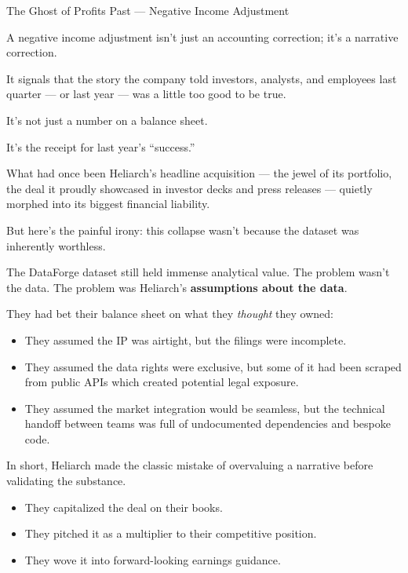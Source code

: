 \begin{HistoricalSidebar}{The Ghost of Profits Past --- Negative Income Adjustment}
  \medskip
  
  A negative income adjustment isn’t just an accounting correction; it’s a narrative correction.
  
  \medskip
  
  It signals that the story the company told investors, analysts, and employees last quarter --- or last year --- was a little too good to be true.
  
  \medskip
  
  
  It’s not just a number on a balance sheet.  
  
  \medskip
  
  It’s the receipt for last year’s “success.”
  
\end{HistoricalSidebar}

\medskip

What had once been Heliarch’s headline acquisition --- the jewel of its portfolio, the deal it proudly showcased in investor decks and press releases --- quietly morphed into its biggest financial liability.

But here’s the painful irony: this collapse wasn’t because the dataset was inherently worthless.

The DataForge dataset still held immense analytical value. The problem wasn’t the data. The problem was Heliarch’s \textbf{assumptions about the data}.

They had bet their balance sheet on what they \textit{thought} they owned:

\begin{itemize}
    \item They assumed the IP was airtight, but the filings were incomplete.
    \item They assumed the data rights were exclusive, but some of it had been scraped from public APIs which created potential legal exposure.
    \item They assumed the market integration would be seamless, but the technical handoff between teams was full of undocumented dependencies and bespoke code.
\end{itemize}

In short, Heliarch made the classic mistake of overvaluing a narrative before validating the substance.

\begin{itemize}
    \item They capitalized the deal on their books.
    \item They pitched it as a multiplier to their competitive position.
    \item They wove it into forward-looking earnings guidance.
\end{itemize}

